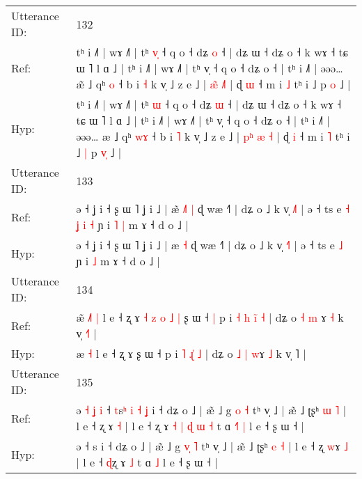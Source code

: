 \documentclass[10pt]{article}
\DeclareRobustCommand{\hl}[1]{{\textcolor{red}{#1}}}
\begin{document}
\begin{longtable}{ll}
 \\
\midrule
Utterance ID: & 132 \\
Ref: & tʰ i ˩˥ | wɤ ˩˥ | tʰ \hl{v}\hl{̩} ˧ q o ˧ dʑ \hl{o} ˧ | dʑ ɯ ˧ dʑ o ˧ k wɤ ˧ tɕ ɯ ˥ l ɑ ˩ | tʰ i ˩˥ | wɤ ˩˥ | tʰ v̩ ˧ q o ˧ dʑ o ˧ | tʰ i ˩˥ | əəə… æ\hl{̃} ˩ qʰ \hl{}\hl{o} ˧ b i \hl{˧} k v̩ ˩ z e ˩ | \hl{æ}\hl{̃} \hl{}\hl{˩}\hl{˥} | ɖ \hl{ɯ} ˧ m i \hl{˩} tʰ i ˩\hl{}\hl{} p \hl{}\hl{o} ˩ |
 \\
Hyp: & tʰ i ˩˥ | wɤ ˩˥ | tʰ \hl{}\hl{ɯ} ˧ q o ˧ dʑ \hl{ɯ} ˧ | dʑ ɯ ˧ dʑ o ˧ k wɤ ˧ tɕ ɯ ˥ l ɑ ˩ | tʰ i ˩˥ | wɤ ˩˥ | tʰ v̩ ˧ q o ˧ dʑ o ˧ | tʰ i ˩˥ | əəə… æ\hl{} ˩ qʰ \hl{w}\hl{ɤ} ˧ b i \hl{˥} k v̩ ˩ z e ˩ | \hl{p}\hl{ʰ} \hl{æ}\hl{ }\hl{˧} | ɖ \hl{i} ˧ m i \hl{˥} tʰ i ˩\hl{ }\hl{|} p \hl{v}\hl{̩} ˩ |
 \\
\midrule
Utterance ID: & 133 \\
Ref: & ə ˧ ʝ i ˧ ʂ ɯ ˥ ʝ i ˩ | æ\hl{̃}\hl{ }\hl{˩}\hl{˥} \hl{|} ɖ wæ ˧˥ | dʑ o ˩ k v̩ \hl{˩}˥ | ə ˧ ts e\hl{ }\hl{˧}\hl{ }\hl{ʝ}\hl{ }\hl{i} \hl{˧} ɲ i\hl{ }\hl{˥} \hl{|} m ɤ ˧ d o ˩ |
 \\
Hyp: & ə ˧ ʝ i ˧ ʂ ɯ ˥ ʝ i ˩ | æ\hl{}\hl{}\hl{}\hl{} \hl{˧} ɖ wæ ˧˥ | dʑ o ˩ k v̩ \hl{˧}˥ | ə ˧ ts e\hl{}\hl{}\hl{}\hl{}\hl{}\hl{} \hl{˩} ɲ i\hl{}\hl{} \hl{˩} m ɤ ˧ d o ˩ |
 \\
\midrule
Utterance ID: & 134 \\
Ref: & æ\hl{̃}\hl{ }\hl{˩}\hl{˥} \hl{|} l e ˧ ʐ ɤ\hl{ }\hl{˧}\hl{ }\hl{z}\hl{ }\hl{o}\hl{ }\hl{˩}\hl{ }\hl{|} ʂ ɯ ˧\hl{ }\hl{|} p i\hl{ }\hl{˧} \hl{h} \hl{i}\hl{̃} \hl{˧} | dʑ o \hl{˧} \hl{m} \hl{}ɤ \hl{˧} k v̩ \hl{˧}˥ |
 \\
Hyp: & æ\hl{}\hl{}\hl{}\hl{} \hl{˧} l e ˧ ʐ ɤ\hl{}\hl{}\hl{}\hl{}\hl{}\hl{}\hl{}\hl{}\hl{}\hl{} ʂ ɯ ˧\hl{}\hl{} p i\hl{}\hl{} \hl{˥} \hl{ɻ}\hl{̍} \hl{˩} | dʑ o \hl{˩} \hl{|} \hl{w}ɤ \hl{˩} k v̩ \hl{}˥ |
 \\
\midrule
Utterance ID: & 135 \\
Ref: & ə\hl{ }\hl{˧}\hl{ }\hl{ʝ}\hl{ }\hl{i} ˧ \hl{t}s\hl{ʰ}\hl{ }\hl{i}\hl{ }\hl{˧}\hl{ }\hl{ʝ} i ˧ dʑ o ˩ | æ̃ ˩ g \hl{}\hl{o} \hl{˧} tʰ v̩ ˩ | æ̃ ˩ ʈʂʰ \hl{ɯ} \hl{˥} | l e ˧ ʐ \hl{}ɤ \hl{˧} | l e ˧ \hl{}ʐ ɤ\hl{ }\hl{˧}\hl{ }\hl{|}\hl{ }\hl{ɖ}\hl{ }\hl{ɯ} \hl{˧} t ɑ\hl{ }\hl{˧}\hl{˥} \hl{|} l e ˧ ʂ ɯ ˧ |
 \\
Hyp: & ə\hl{}\hl{}\hl{}\hl{}\hl{}\hl{} ˧ \hl{}s\hl{}\hl{}\hl{}\hl{}\hl{}\hl{}\hl{} i ˧ dʑ o ˩ | æ̃ ˩ g \hl{v}\hl{̩} \hl{˥} tʰ v̩ ˩ | æ̃ ˩ ʈʂʰ \hl{e} \hl{˧} | l e ˧ ʐ \hl{w}ɤ \hl{˩} | l e ˧ \hl{ɖ}ʐ ɤ\hl{}\hl{}\hl{}\hl{}\hl{}\hl{}\hl{}\hl{} \hl{˩} t ɑ\hl{}\hl{}\hl{} \hl{˩} l e ˧ ʂ ɯ ˧ |

\end{longtable}
\end{document}
